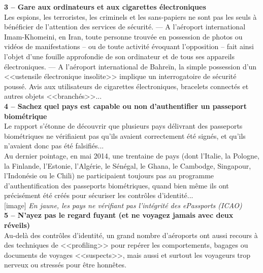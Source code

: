 \documentclass[11pt,twoside,a4paper]{article}
\begin{document}
\textbf{\large 3 -- Gare aux ordinateurs et aux cigarettes {\'e}lectroniques}~\\

Les espions, les terroristes, les criminels et les sans-papiers ne sont pas les seuls {\`a} b{\'e}n{\'e}ficier de l'attention des services de s{\'e}curit{\'e}. --- A l'a{\'e}roport international Imam-Khomeini, en Iran, toute personne trouv{\'e}e en possession de photos ou vid{\'e}os de manifestations -- ou de toute activit{\'e} {\'e}voquant l'opposition -- fait ainsi l'objet d'une fouille approfondie de son ordinateur et de tous ses appareils {\'e}lectroniques. --- A l'a{\'e}roport international de Bahre{\"i}n, la simple possession d'un <<ustensile {\'e}lectronique insolite>> implique un interrogatoire de s{\'e}curit{\'e} pouss{\'e}. Avis aux utilisateurs de cigarettes {\'e}lectroniques, bracelets connect{\'e}s et autres objets <<branch{\'e}s>>... ~\\

\textbf{\large 4 -- Sachez quel pays est capable ou non d'authentifier un passeport biom{\'e}trique}~\\

Le rapport s'{\'e}tonne de d{\'e}couvrir que plusieurs pays d{\'e}livrant des passeports biom{\'e}triques ne v{\'e}rifiaient pas qu'ils avaient correctement {\'e}t{\'e} sign{\'e}s, et qu'ils n'avaient donc pas {\'e}t{\'e} falsifi{\'e}s... ~\\

Au dernier pointage, en mai 2014, une trentaine de pays (dont l'Italie, la Pologne, la Finlande, l'Estonie, l'Alg{\'e}rie, le S{\'e}n{\'e}gal, le Ghana, le Cambodge, Singapour, l'Indon{\'e}sie ou le Chili) ne participaient toujours pas au programme d'authentification des passeports biom{\'e}triques, quand bien m{\^e}me ils ont pr{\'e}cis{\'e}ment {\'e}t{\'e} cr{\'e}{\'e}s pour s{\'e}curiser les contr{\^o}les d'identit{\'e}... ~\\

[image]
\emph{En jaune, les pays ne v{\'e}rifiant pas l'int{\'e}grit{\'e} des ePassports (ICAO)} ~\\

\textbf{\large 5 -- N'ayez pas le regard fuyant (et ne voyagez jamais avec deux r{\'e}veils)}~\\

Au-del{\`a} des contr{\^o}les d'identit{\'e}, un grand nombre d'a{\'e}roports ont aussi recours {\`a} des techniques de <<profiling>> pour rep{\'e}rer les comportements, bagages ou documents de voyages <<suspects>>, mais aussi et surtout les voyageurs trop nerveux ou stress{\'e}s pour {\^e}tre honn{\^e}tes. ~\\
\end{document}

